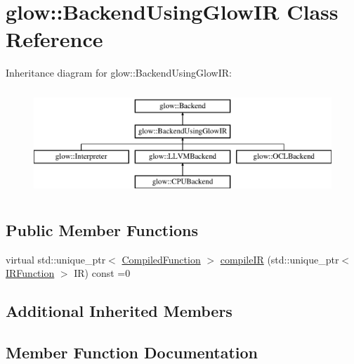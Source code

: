 \hypertarget{classglow_1_1_backend_using_glow_i_r}{}\section{glow\+:\+:Backend\+Using\+Glow\+IR Class Reference}
\label{classglow_1_1_backend_using_glow_i_r}
Inheritance diagram for glow\+:\+:Backend\+Using\+Glow\+IR\+:\begin{figure}[H]
\begin{center}
\leavevmode
\includegraphics[height=4.000000cm]{classglow_1_1_backend_using_glow_i_r}
\end{center}
\end{figure}
\subsection*{Public Member Functions}
\begin{DoxyCompactItemize}
\item 
virtual std\+::unique\+\_\+ptr$<$ \hyperlink{classglow_1_1_compiled_function}{Compiled\+Function} $>$ \hyperlink{classglow_1_1_backend_using_glow_i_r_ab7531d0b400c5f9763f8a58f05565159}{compile\+IR} (std\+::unique\+\_\+ptr$<$ \hyperlink{classglow_1_1_i_r_function}{I\+R\+Function} $>$ IR) const =0
\end{DoxyCompactItemize}
\subsection*{Additional Inherited Members}


\subsection{Member Function Documentation}
\mbox{\label{classglow_1_1_backend_using_glow_i_r_ab7531d0b400c5f9763f8a58f05565159}} 
